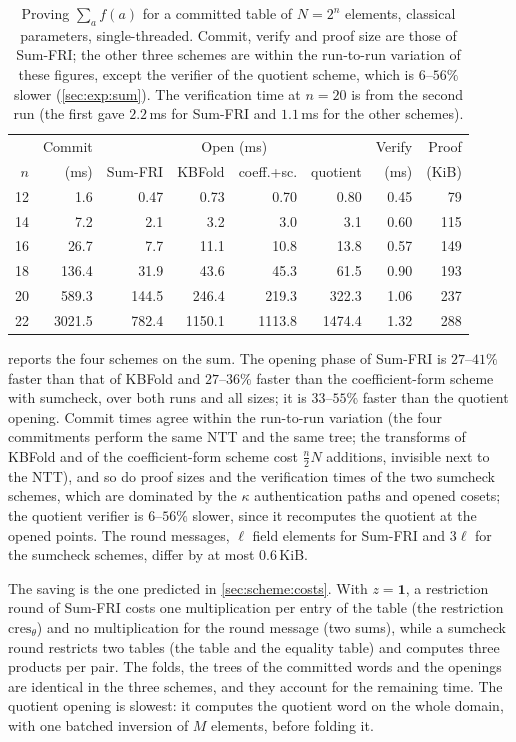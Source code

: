 \begin{table}[t]
\centering
\small
\begin{tabular}{r r rrrr r r}
\toprule
 & Commit & \multicolumn{4}{c}{Open (ms)} & Verify & Proof \\
$n$ & (ms) & Sum-FRI & KBFold & coeff.+sc. & quotient & (ms) & (KiB) \\
\midrule
12 & 1.6 & 0.47 & 0.73 & 0.70 & 0.80 & 0.45 & 79 \\
14 & 7.2 & 2.1 & 3.2 & 3.0 & 3.1 & 0.60 & 115 \\
16 & 26.7 & 7.7 & 11.1 & 10.8 & 13.8 & 0.57 & 149 \\
18 & 136.4 & 31.9 & 43.6 & 45.3 & 61.5 & 0.90 & 193 \\
20 & 589.3 & 144.5 & 246.4 & 219.3 & 322.3 & 1.06 & 237 \\
22 & 3021.5 & 782.4 & 1150.1 & 1113.8 & 1474.4 & 1.32 & 288 \\
\bottomrule
\end{tabular}
\caption{Proving $\sum_a f(a)$ for a committed table of $N = 2^n$ elements, classical parameters, single-threaded. Commit, verify and proof size are those of Sum-FRI; the other three schemes are within the run-to-run variation of these figures, except the verifier of the quotient scheme, which is $6$--$56\%$ slower (\cref{sec:exp:sum}). The verification time at $n = 20$ is from the second run (the first gave $2.2$\,ms for Sum-FRI and $1.1$\,ms for the other schemes).}
\label{tab:sum}
\end{table}

 reports the four schemes on the sum.
The opening phase of Sum-FRI is $27$--$41\%$ faster than that of KBFold and $27$--$36\%$ faster than the coefficient-form scheme with sumcheck, over both runs and all sizes; it is $33$--$55\%$ faster than the quotient opening.
Commit times agree within the run-to-run variation (the four commitments perform the same NTT and the same tree; the transforms of KBFold and of the coefficient-form scheme cost $\tfrac n2 N$ additions, invisible next to the NTT), and so do proof sizes and the verification times of the two sumcheck schemes, which are dominated by the $\kappa$ authentication paths and opened cosets; the quotient verifier is $6$--$56\%$ slower, since it recomputes the quotient at the opened points.
The round messages, $\ell$ field elements for Sum-FRI and $3\ell$ for the sumcheck schemes, differ by at most $0.6$\,KiB.

The saving is the one predicted in \cref{sec:scheme:costs}.
With $z = \mathbf 1$, a restriction round of Sum-FRI costs one multiplication per entry of the table (the restriction $\mathrm{cres}_\theta$) and no multiplication for the round message (two sums), while a sumcheck round restricts two tables (the table and the equality table) and computes three products per pair.
The folds, the trees of the committed words and the openings are identical in the three schemes, and they account for the remaining time.
The quotient opening is slowest: it computes the quotient word on the whole domain, with one batched inversion of $M$ elements, before folding it.

